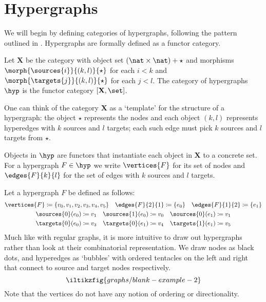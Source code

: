 \section{Hypergraphs}

We will begin by defining categories of hypergraphs, following the
pattern outlined in \cite{bonchi2022string}.
Hypergraphs are formally defined as a functor category.

\begin{definition}\label{def:hypergraph}
    Let \(\mathbf{X}\) be the category with object set
    \((\nat \times \nat) + \star\) and morphisms
    \(\morph{\sources{i}}{(k,l)}{\star}\) for each \(i < k\)
    and \(\morph{\targets{j}}{(k,l)}{\star}\) for each \(j < l\).
    The category of hypergraphs \(\hyp\) is the functor category
    \([\mathbf{X}, \set]\).
\end{definition}

One can think of the category \(\mathbf{X}\) as a `template' for the structure
of a hypergraph: the object \(\star\) represents the nodes and each object
\((k, l)\) represents hyperedges with \(k\) sources and \(l\) targets; each such
edge must pick \(k\) sources and \(l\) targets from \(\star\).

Objects in \(\hyp\) are functors that instantiate each object in \(\mathbf{X}\)
to a concrete set.
For a hypergraph \(F \in \hyp\) we write \(\vertices{F}\) for its
set of nodes and \(\edges{F}{k}{l}\) for the set of edges with \(k\) sources and
\(l\) targets.

\begin{example}\label{ex:hypergraph}
    Let a hypergraph \(F\) be defined as follows:
    \begin{gather*}
        \vertices{F} \coloneqq \{v_0,v_1,v_2,v_3,v_4,v_5\}
        \quad
        \edges{F}{2}{1} \coloneqq \{e_0\}
        \quad
        \edges{F}{1}{2} \coloneqq \{e_1\}
        \\
        \sources{0}(e_0) \coloneqq v_1
        \quad
        \sources{1}(e_0) \coloneqq v_0
        \quad
        \sources{0}(e_1) \coloneqq v_1
        \\
        \targets{0}(e_0) \coloneqq v_3
        \quad
        \targets{0}(e_1) \coloneqq v_4
        \quad
        \targets{1}(e_1) \coloneqq v_5
    \end{gather*}
    Much like with regular graphs, it is more intuitive to draw out hypergraphs
    rather than look at their combinatorial representation.
    We draw nodes as black dots, and hyperedges as `bubbles' with ordered tentacles
    on the left and right that connect to source and target nodes respectively.
    \[
        \iltikzfig{graphs/blank-example-2}
    \]
    Note that the vertices do not have any notion of ordering or directionality.
\end{example}


